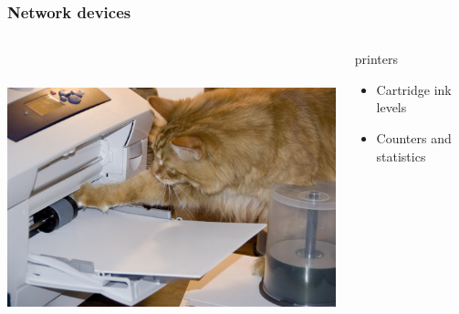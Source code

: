 \documentclass{beamer}
\begin{document}
\begin{frame}

    \frametitle{Network devices}


 \begin{columns}
 \begin{column}{0.15\textwidth}
         \includegraphics[height=8.5cm]{./pics/printer.jpg}
 \end{column}
 \begin{column}{1.25\textwidth}
    

    \begin{block}{printers}
        \begin{itemize}
            \item Cartridge ink levels
            \item Counters and statistics
        \end{itemize}
    \end{block}

 \end{column}
\end{columns}
\end{frame}
\end{document}
